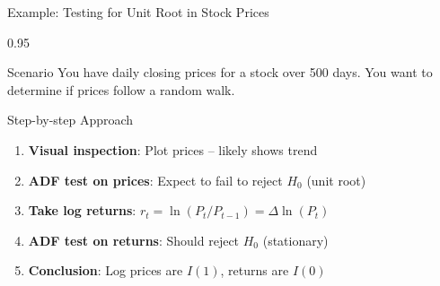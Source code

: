 \documentclass[9pt, aspectratio=169, t]{beamer}
\begin{document}
\begin{frame}{Example: Testing for Unit Root in Stock Prices}
    \begin{cminipage}{0.95\textwidth}
    \begin{block}{Scenario}
        You have daily closing prices for a stock over 500 days. You want to determine if prices follow a random walk.
    \end{block}

    \vspace{0.3cm}

    \begin{exampleblock}{Step-by-step Approach}
        \begin{enumerate}
            \item \textbf{Visual inspection}: Plot prices -- likely shows trend
            \item \textbf{ADF test on prices}: Expect to fail to reject $H_0$ (unit root)
            \item \textbf{Take log returns}: $r_t = \ln(P_t/P_{t-1}) = \Delta \ln(P_t)$
            \item \textbf{ADF test on returns}: Should reject $H_0$ (stationary)
            \item \textbf{Conclusion}: Log prices are $I(1)$, returns are $I(0)$
        \end{enumerate}
    \end{exampleblock}
    \end{cminipage}
\end{frame}
\end{document}
